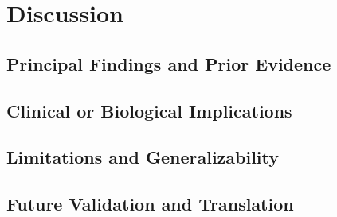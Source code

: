 \chapter{Discussion}
\label{ch:discussion}

\section{Principal Findings and Prior Evidence}

\section{Clinical or Biological Implications}

\section{Limitations and Generalizability}

\section{Future Validation and Translation}
